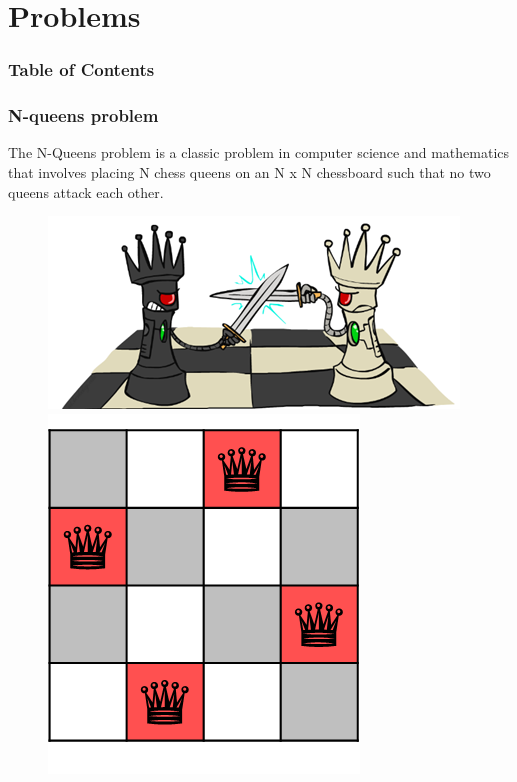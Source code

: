 \documentclass[
	11pt,
]{beamer}
\begin{document}
\section{Problems}
\begin{frame}
    \frametitle{Table of Contents}
    \tableofcontents[currentsection]
\end{frame}
\begin{frame}
	\frametitle{N-queens problem}
	The N-Queens problem is a classic problem in computer science and mathematics that involves placing N chess queens on an N x N chessboard such that no two queens attack each other.
    \bigskip 
    \begin{figure}
        \centering
        \begin{minipage}{.5\textwidth}
          \centering
          \includegraphics[scale=0.4]{Figs/n_queens_1.png}
        \end{minipage}%
        \begin{minipage}{.5\textwidth}
          \centering
          \includegraphics[scale=0.4]{Figs/n_queens_2.png}
        \end{minipage}
        \end{figure}
\end{frame}
\end{document}
